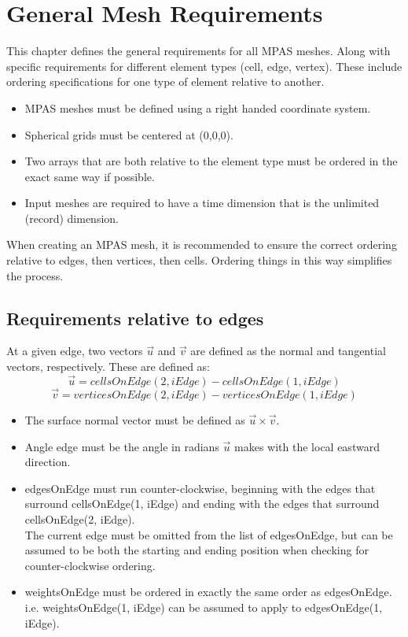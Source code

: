 \documentclass[11pt]{report}
\begin{document}

\chapter{General Mesh Requirements}

This chapter defines the general requirements for all MPAS meshes. Along with specific requirements for different element types (cell, edge, vertex). These include ordering specifications for one type of element relative to another.

\begin{itemize}
	\item MPAS meshes must be defined using a right handed coordinate system.
	\item Spherical grids must be centered at (0,0,0).
	\item Two arrays that are both relative to the element type must be ordered in the exact same way if possible.
	\item Input meshes are required to have a time dimension that is the unlimited (record) dimension.
\end{itemize}

When creating an MPAS mesh, it is recommended to ensure the correct ordering
relative to edges, then vertices, then cells. Ordering things in this way
simplifies the process.

\section{Requirements relative to edges}

At a given edge, two vectors $\vec{u}$ and $\vec{v}$ are defined as the normal and tangential vectors, respectively. These are defined as:
\begin{equation}
	\vec{u} = cellsOnEdge(2, iEdge) - cellsOnEdge(1, iEdge)
\end{equation}
\begin{equation}
	\vec{v} = verticesOnEdge(2, iEdge) - verticesOnEdge(1, iEdge)
\end{equation}

\begin{itemize}
	\item The surface normal vector must be defined as $\vec{u} \times \vec{v}$.
	\item Angle edge must be the angle in radians $\vec{u}$ makes with the local eastward direction.
	\item edgesOnEdge must run counter-clockwise, beginning with the edges that surround cellsOnEdge(1, iEdge) and ending with the edges that surround cellsOnEdge(2, iEdge). \\
		  The current edge must be omitted from the list of edgesOnEdge, but can be assumed to be both the starting and ending position when checking for counter-clockwise ordering.
	\item weightsOnEdge must be ordered in exactly the same order as edgesOnEdge. i.e. weightsOnEdge(1, iEdge) can be assumed to apply to edgesOnEdge(1, iEdge).
\end{itemize}
\end{document}
